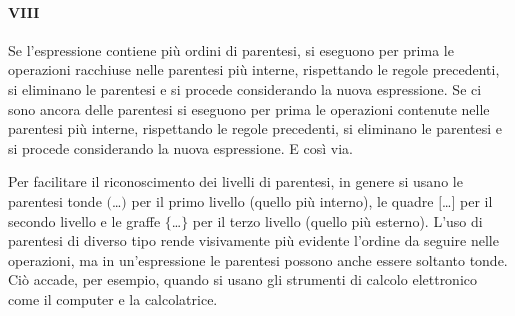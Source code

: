 \paragraph{VIII} Se l'espressione contiene più ordini di parentesi, si eseguono per prima le operazioni racchiuse nelle parentesi più interne, rispettando le regole precedenti, si eliminano le parentesi e si procede considerando la nuova espressione. Se ci sono ancora delle parentesi si eseguono per prima le operazioni contenute nelle parentesi più interne, rispettando le regole precedenti, si eliminano le parentesi e si procede considerando la nuova espressione. E così via.

Per facilitare il riconoscimento dei livelli di parentesi, in genere si usano le parentesi tonde $($\ldots$)$ per il primo livello (quello più interno), le quadre $[$\ldots$]$ per il secondo livello e le graffe $\{$\ldots$\}$ per il terzo livello (quello più esterno).
L'uso di parentesi di diverso tipo rende visivamente più evidente l'ordine da seguire nelle operazioni, ma in un'espressione le parentesi possono anche essere soltanto tonde. Ciò accade, per esempio, quando si usano gli strumenti di calcolo elettronico come il computer e la calcolatrice.

\vspazio\ovalbox{\risolvi\ref{ese:1.27}}
\newpage



\cleardoublepage
